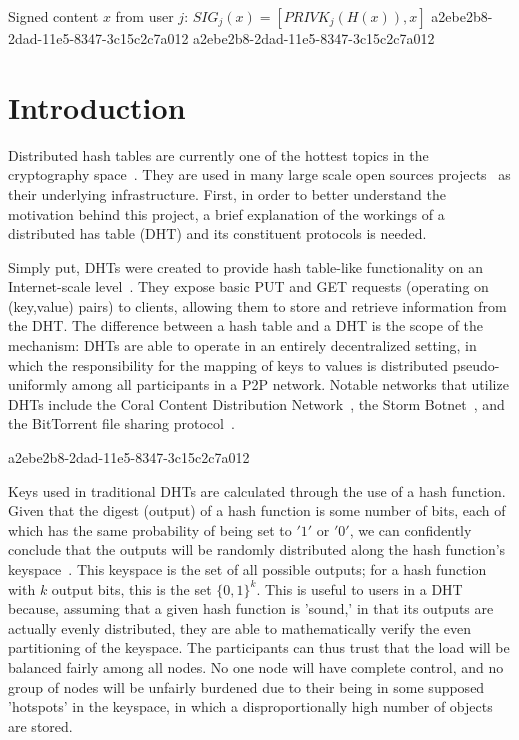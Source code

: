 \documentclass[12pt]{article}
\begin{document}
Signed content $x$ from user $j$: $SIG_j(x) = \left[ PRIVK_j( H(x) ), x \right]$
a2ebe2b8-2dad-11e5-8347-3c15c2c7a012
a2ebe2b8-2dad-11e5-8347-3c15c2c7a012\section{Introduction}
\par Distributed hash tables are currently one of the hottest topics in the cryptography space~\cite{Stoica:2001dj,Rowstron:2001ea,Ratnasamy:2001wn}. They are used in many large scale open sources projects~\cite{Freitas:2013tb,Xu:2010vs,Perfitt:2010fh} as their underlying infrastructure. First, in order to better understand the motivation behind this project, a brief explanation of the workings of a distributed has table (DHT) and its constituent protocols is needed.

\par Simply put, DHTs were created to provide hash table-like functionality on an Internet-scale level~\cite{Ratnasamy:2001wn}. They expose basic PUT and GET requests (operating on (key,value) pairs) to clients, allowing them to store and retrieve information from the DHT. The difference between a hash table and a DHT is the scope of the mechanism: DHTs are able to operate in an entirely decentralized setting, in which the responsibility for the mapping of keys to values is distributed pseudo-uniformly among all participants in a P2P network. Notable networks that utilize DHTs include the Coral Content Distribution Network~\cite{Freedman:2004vb}, the Storm Botnet~\cite{Holz:2008uk}, and the BitTorrent file sharing protocol~\cite{Cohen:y1_8mBnw}.

a2ebe2b8-2dad-11e5-8347-3c15c2c7a012\par Keys used in traditional DHTs are calculated through the use of a hash function. Given that the digest (output) of a hash function is some number of bits, each of which has the same probability of being set to $'1'$ or $'0'$, we can confidently conclude that the outputs will be randomly distributed along the hash function's keyspace~. This keyspace is the set of all possible outputs; for a hash function with $k$ output bits, this is the set $\{0,1\}^k$. This is useful to users in a DHT because, assuming that a given hash function is 'sound,' in that its outputs are actually evenly distributed, they are able to mathematically verify the even partitioning of the keyspace. The participants can thus trust that the load will be balanced fairly among all nodes. No one node will have complete control, and no group of nodes will be unfairly burdened due to their being in some supposed 'hotspots' in the keyspace, in which a disproportionally high number of objects are stored.~
\end{document}
